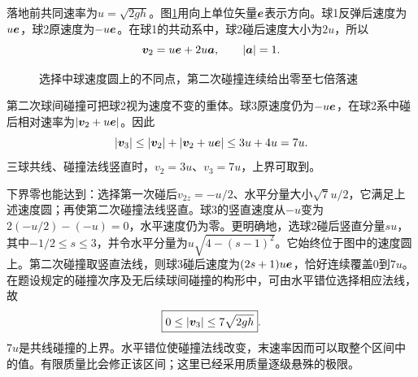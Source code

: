 \begin{solution}
落地前共同速率为$u=\sqrt{2gh}$。图\ref{fig:hw5-8-s}用向上单位矢量$\bm{e}$表示方向。球1反弹后速度为$u\bm{e}$，球2原速度为$-u\bm{e}$。在球1的共动系中，球2碰后速度大小为$2u$，所以
\[
 \bm{v}_2=u\bm{e}+2u\bm{a},\qquad |\bm{a}|=1.
\]

\begin{figure}[H]\centering
{}
\caption{选择中球速度圆上的不同点，第二次碰撞连续给出零至七倍落速}\label{fig:hw5-8-s}
\end{figure}

第二次球间碰撞可把球2视为速度不变的重体。球3原速度仍为$-u\bm{e}$，在球2系中碰后相对速率为$|\bm{v}_2+u\bm{e}|$。因此
\[
 |\bm{v}_3|\le|\bm{v}_2|+|\bm{v}_2+u\bm{e}|\le3u+4u=7u.
\]
三球共线、碰撞法线竖直时，$v_2=3u$、$v_3=7u$，上界可取到。

下界零也能达到：选择第一次碰后$v_{2z}=-u/2$、水平分量大小$\sqrt7u/2$，它满足上述速度圆；再使第二次碰撞法线竖直。球3的竖直速度从$-u$变为$2(-u/2)-(-u)=0$，水平速度仍为零。更明确地，选球2碰后竖直分量$su$，其中$-1/2\le s\le3$，并令水平分量为$u\sqrt{4-(s-1)^2}$。它始终位于图中的速度圆上。第二次碰撞取竖直法线，则球3碰后速度为$(2s+1)u\bm{e}$，恰好连续覆盖$0$到$7u$。在题设规定的碰撞次序及无后续球间碰撞的构形中，可由水平错位选择相应法线，故
\[
 \boxed{0\le|\bm{v}_3|\le7\sqrt{2gh}}.
\]
$7u$是共线碰撞的上界。水平错位使碰撞法线改变，末速率因而可以取整个区间中的值。有限质量比会修正该区间；这里已经采用质量逐级悬殊的极限。


\end{solution}



